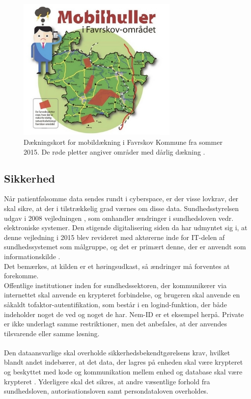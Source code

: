 \begin{figure}[H]
\centering
\includegraphics[width=0.7\textwidth]{Figurer/daekningskort.png}
\caption{\label{fig:dkort}Dækningskort for mobildækning i Favrskov Kommune fra sommer 2015. De røde pletter angiver områder med dårlig dækning \parencite{daekningskort}.}
\end{figure}
\subsection{Sikkerhed}
Når patientfølsomme data sendes rundt i cyberspace, er der visse lovkrav, der skal sikre, at der i tilstrækkelig grad værnes om disse data.
Sundhedsstyrelsen udgav i 2008 vejledningen , som omhandler ændringer i sundhedsloven vedr. elektroniske systemer. Den stigende digitalisering siden da har udmyntet sig i, at denne vejledning i 2015 blev revideret med aktørerne inde for IT-delen af sundhedssystemet som målgruppe, og det er primært denne, der er anvendt som informationskilde \parencite{vogi}.\\Det bemærkes, at kilden er et høringsudkast, så ændringer må forventes at forekomme.\\
Offentlige institutioner inden for sundhedssektoren, der kommunikerer via internettet skal anvende en krypteret forbindelse, og brugeren skal anvende en såkaldt tofaktor-autentifikation, som består i en logind-funktion, der både indeholder noget de ved og noget de har. Nem-ID er et eksempel herpå. Private er ikke underlagt samme restriktioner, men det anbefales, at der anvendes tilsvarende eller samme løsning.\\ \\
Den dataansvarlige skal overholde sikkerhedsbekendtgørelsens krav, hvilket blandt andet indebærer, at det data, der lagres på enheden skal være krypteret og beskyttet med kode og kommunikation mellem enhed og database skal være krypteret \parencite{shbekendt}. Yderligere skal det sikres, at andre væsentlige forhold fra sundhedsloven, autorisationsloven samt persondataloven overholdes. 

